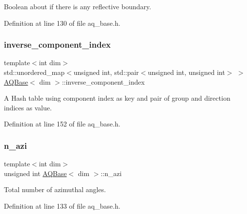 Boolean about if there is any reflective boundary. 



Definition at line 130 of file aq\+\_\+base.\+h.

\mbox{\label{class_a_q_base_a657640cc73cef6130bdf5b325dd0fd11}} 
\subsubsection{\texorpdfstring{inverse\+\_\+component\+\_\+index}{inverse\_component\_index}}
{\footnotesize\ttfamily template$<$int dim$>$ \\
std\+::unordered\+\_\+map$<$unsigned int, std\+::pair$<$unsigned int, unsigned int$>$ $>$ \hyperlink{class_a_q_base}{A\+Q\+Base}$<$ dim $>$\+::inverse\+\_\+component\+\_\+index\hspace{0.3cm}{\ttfamily [protected]}}

A Hash table using component index as key and pair of group and direction indices as value. 

Definition at line 152 of file aq\+\_\+base.\+h.

\mbox{\label{class_a_q_base_aaff6bd848436445d267c1a121a93e4ea}} 
\subsubsection{\texorpdfstring{n\+\_\+azi}{n\_azi}}
{\footnotesize\ttfamily template$<$int dim$>$ \\
unsigned int \hyperlink{class_a_q_base}{A\+Q\+Base}$<$ dim $>$\+::n\+\_\+azi\hspace{0.3cm}{\ttfamily [protected]}}



Total number of azimuthal angles. 



Definition at line 133 of file aq\+\_\+base.\+h.

\mbox{\label{class_a_q_base_a93b0c70dd1d3ec401601ceaca88723b1}} 
